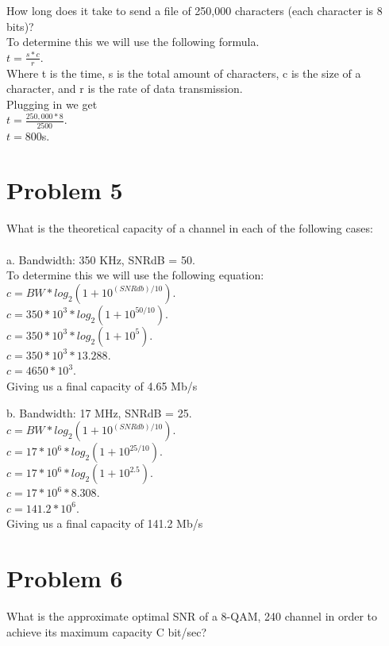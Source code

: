 \documentclass{article}
\begin{document}
\subP How long does it take to send a file of 250,000 characters (each
character is 8 bits)?\\
To determine this we will use the following formula.\\
$t = \frac{s*c}{r}$.\\
Where t is the time, s is the total amount of characters, c is the size of a character,
and r is the rate of data transmission.\\
Plugging in we get\\
$t = \frac{250,000 * 8}{2500}$.\\
$t = 800$s.\\

\section*{Problem 5} %
What is the theoretical capacity of a channel in each of the following cases:\\\\
\subP a. Bandwidth: 350 KHz, SNRdB = 50.\\
To determine this we will use the following equation:\\
$c = BW * log_{2}(1 + 10^{(SNRdb)/10})$.\\
$c = 350 * 10^{3} * log_{2}(1 + 10^{50/10})$.\\
$c = 350 * 10^{3} * log_{2}(1 + 10^{5})$.\\
$c = 350 * 10^{3} * 13.288$.\\
$c = 4650 * 10^{3}$.\\
Giving us a final capacity of 4.65 Mb/s

\subP b. Bandwidth: 17 MHz, SNRdB = 25.\\
$c = BW * log_{2}(1 + 10^{(SNRdb)/10})$.\\
$c = 17 * 10^{6} * log_{2}(1 + 10^{25/10})$.\\
$c = 17 * 10^{6} * log_{2}(1 + 10^{2.5})$.\\
$c = 17 * 10^{6} * 8.308$.\\
$c = 141.2 * 10^{6}$.\\
Giving us a final capacity of 141.2 Mb/s


\section*{Problem 6}
What is the approximate optimal SNR of a 8-QAM, 240 channel in order to achieve its
maximum capacity C bit/sec?\\\\
\end{document}
